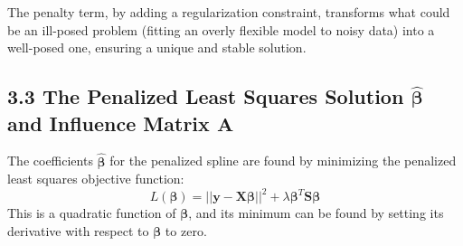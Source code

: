 \documentclass[11pt, a4paper]{article}
\begin{document}
The penalty term, by adding a regularization constraint, transforms what could be an ill-posed problem (fitting an overly flexible model to noisy data) into a well-posed one, ensuring a unique and stable solution.

\subsection{3.3 The Penalized Least Squares Solution $\hat{\boldsymbol{\beta}}$ and Influence Matrix $\mathbf{A}$}
The coefficients $\hat{\boldsymbol{\beta}}$ for the penalized spline are found by minimizing the penalized least squares objective function:
\[ L(\boldsymbol{\beta}) = ||\mathbf{y} - \mathbf{X}\boldsymbol{\beta}||^2 + \lambda \boldsymbol{\beta}^T \mathbf{S} \boldsymbol{\beta} \]
This is a quadratic function of $\boldsymbol{\beta}$, and its minimum can be found by setting its derivative with respect to $\boldsymbol{\beta}$ to zero.
\end{document}
